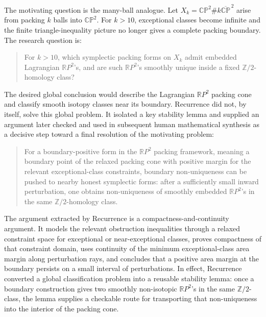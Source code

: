 \documentclass{article}
\theoremstyle{definition}
\theoremstyle{remark}
\begin{document}
The motivating question is the many-ball analogue. Let \(X_k=\mathbb{CP}^2\# k\overline{\mathbb{CP}}^{\,2}\) arise from packing \(k\) balls into \(\mathbb{CP}^2\). For \(k>10\), exceptional classes become infinite and the finite triangle-inequality picture no longer gives a complete packing boundary. The research question is:
\begin{quote}
For \(k>10\), which symplectic packing forms on \(X_k\) admit embedded Lagrangian \(\mathbb{R}P^2\)'s, and are such \(\mathbb{R}P^2\)'s smoothly unique inside a fixed \(\mathbb{Z}/2\)-homology class?
\end{quote}
The desired global conclusion would describe the Lagrangian \(\mathbb{R}P^2\) packing cone and classify smooth isotopy classes near its boundary. Recurrence did not, by itself, solve this global problem. It isolated a key stability lemma and supplied an argument later checked and used in subsequent human mathematical synthesis as a decisive step toward a final resolution of the motivating problem:
\begin{quote}
For a boundary-positive form in the \(\mathbb{R}P^2\) packing framework, meaning a boundary point of the relaxed packing cone with positive margin for the relevant exceptional-class constraints, boundary non-uniqueness can be pushed to nearby honest symplectic forms: after a sufficiently small inward perturbation, one obtains non-uniqueness of smoothly embedded \(\mathbb{R}P^2\)'s in the same \(\mathbb{Z}/2\)-homology class.
\end{quote}

The argument extracted by Recurrence is a compactness-and-continuity argument. It models the relevant obstruction inequalities through a relaxed constraint space for exceptional or near-exceptional classes, proves compactness of that constraint domain, uses continuity of the minimum exceptional-class area margin along perturbation rays, and concludes that a positive area margin at the boundary persists on a small interval of perturbations. In effect, Recurrence converted a global classification problem into a reusable stability lemma: once a boundary construction gives two smoothly non-isotopic \(\mathbb{R}P^2\)'s in the same \(\mathbb{Z}/2\)-class, the lemma supplies a checkable route for transporting that non-uniqueness into the interior of the packing cone.
\end{document}

